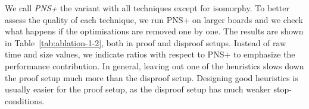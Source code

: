 \documentclass[conference]{IEEEtran}
\theoremstyle{definition}
\begin{document}
We call \emph{PNS+} the variant with all techniques except for isomorphy. To better assess the quality of each technique, we run PNS+ on larger boards and we check what happens if the optimisations are removed one by one. The results are shown in Table~\ref{tab:ablation-1-2}, both in proof and disproof setups. Instead of raw time and size values, we indicate ratios with respect to PNS+ to emphasize the performance contribution. In general, leaving out one of the heuristics slows down the proof setup much more than the disproof setup. Designing good heuristics is usually easier for the proof setup, as the disproof setup has much weaker stop-conditions. 




\end{document}
